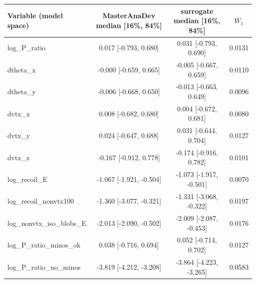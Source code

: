 \begin{tabular}{lccc}
\toprule
Variable (model space) & MasterAnaDev median [16\%, 84\%] & surrogate median [16\%, 84\%] & $W_1$ \\
\midrule
log\_P\_ratio & 0.017 [-0.793, 0.680] & 0.031 [-0.793, 0.690] & 0.0131 \\
dtheta\_x & -0.000 [-0.659, 0.665] & -0.005 [-0.667, 0.659] & 0.0110 \\
dtheta\_y & -0.006 [-0.668, 0.650] & -0.013 [-0.663, 0.649] & 0.0096 \\
dvtx\_x & 0.008 [-0.682, 0.680] & 0.004 [-0.672, 0.681] & 0.0080 \\
dvtx\_y & 0.024 [-0.647, 0.688] & 0.031 [-0.644, 0.704] & 0.0127 \\
dvtx\_z & -0.167 [-0.912, 0.778] & -0.174 [-0.916, 0.782] & 0.0101 \\
log\_recoil\_E & -1.067 [-1.921, -0.504] & -1.073 [-1.917, -0.501] & 0.0070 \\
log\_recoil\_nonvtx100 & -1.360 [-3.077, -0.321] & -1.331 [-3.068, -0.322] & 0.0197 \\
log\_nonvtx\_iso\_blobs\_E & -2.013 [-2.090, -0.502] & -2.009 [-2.087, -0.453] & 0.0176 \\
log\_P\_ratio\_minos\_ok & 0.038 [-0.716, 0.694] & 0.052 [-0.714, 0.702] & 0.0127 \\
log\_P\_ratio\_no\_minos & -3.819 [-4.212, -3.208] & -3.864 [-4.223, -3.265] & 0.0583 \\
\bottomrule
\end{tabular}

